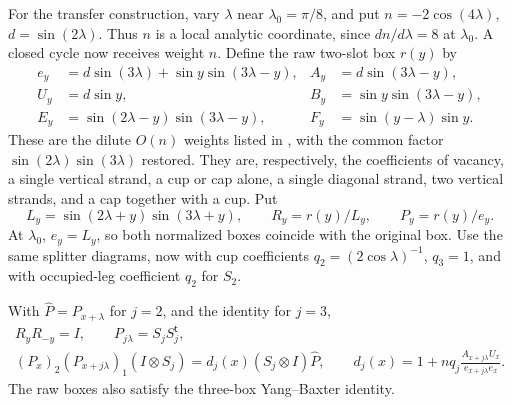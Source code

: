 For the transfer construction, vary \(\lambda\) near \(\lambda_0=\pi/8\), and put
\(n=-2\cos(4\lambda)\), \(d=\sin(2\lambda)\).
Thus \(n\) is a local analytic coordinate, since \(dn/d\lambda=8\) at \(\lambda_0\). A closed cycle now receives weight \(n\). Define the raw two-slot box \(r(y)\) by
\begin{equation}
 \begin{aligned}
 e_y&=d\sin(3\lambda)+\sin y\sin(3\lambda-y),
 & A_y&=d\sin(3\lambda-y),\\
 U_y&=d\sin y,
 & B_y&=\sin y\sin(3\lambda-y),\\
 E_y&=\sin(2\lambda-y)\sin(3\lambda-y),
 & F_y&=\sin(y-\lambda)\sin y.
 \end{aligned}
 \label{eq:05-variable-box}
\end{equation}
These are the dilute \(O(n)\) weights listed in
\cite[equation~(1.2)]{ZhouBatchelor1997}, with the common factor
\(\sin(2\lambda)\sin(3\lambda)\) restored.
They are, respectively, the coefficients of vacancy, a single vertical strand, a cup or cap alone, a single diagonal strand, two vertical strands, and a cap together with a cup. Put
\[
 L_y=\sin(2\lambda+y)\sin(3\lambda+y),\qquad
 R_y=r(y)/L_y,\qquad P_y=r(y)/e_y.
\]
At \(\lambda_0\), \(e_y=L_y\), so both normalized boxes coincide with the original box. Use the same splitter diagrams, now with cup coefficients
\(q_2=(2\cos\lambda)^{-1}\), \(q_3=1\), and with occupied-leg coefficient \(q_2\) for \(S_2\).

\begin{lemma}
\label{lem:05-variable-algebra}
With \(\widehat P=P_{x+\lambda}\) for \(j=2\), and the identity for \(j=3\),
\begin{equation}
 \begin{gathered}
 R_yR_{-y}=I,\qquad P_{j\lambda}=S_jS_j^{\mathsf t},\\
 (P_x)_2(P_{x+j\lambda})_1(I\otimes S_j)
   =d_j(x)(S_j\otimes I)\widehat P,\qquad
 d_j(x)=1+nq_j\frac{A_{x+j\lambda}U_x}
                          {e_{x+j\lambda}e_x}.
 \end{gathered}
 \label{eq:05-variable-splitting}
\end{equation}
The raw boxes also satisfy the three-box Yang--Baxter identity.
\end{lemma}

